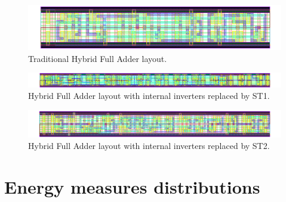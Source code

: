 \documentclass[pgmicro,mestrado,english]{iiufrgs}
\begin{document}
\newpage


\begin{figure}[]
\centering
\includegraphics[width=1.5\textwidth, angle =90]{HYBRID.png}
\caption{Traditional Hybrid Full Adder layout.}
\label{fig:HYBRID}
\end{figure}

\newpage
\begin{figure}[]
\centering
\includegraphics[width=1.5\textwidth, angle =90]{HYBRIDST1.png}
\caption{Hybrid Full Adder layout with internal inverters replaced by ST1.}
\label{fig:HYBRIDST1}
\end{figure}

\newpage
\begin{figure}[]
\centering
\includegraphics[width=1.5\textwidth, angle =90]{HYBRIDST2.png}
\caption{Hybrid Full Adder layout with internal inverters replaced by ST2.}
\label{fig:HYBRIDST2}
\end{figure}


\chapter{Energy measures distributions}

\addtolength{\oddsidemargin}{-.875in}
\addtolength{\evensidemargin}{-.875in}
\addtolength{\textwidth}{1.75in}
\end{document}
